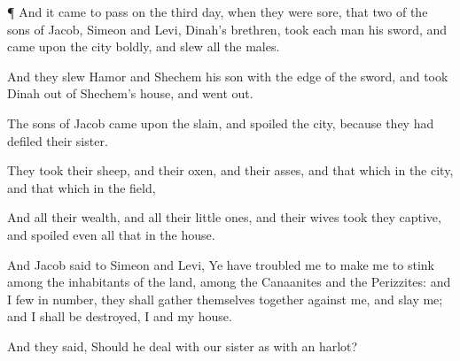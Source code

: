 {\par }{\PP {}¶ And it came to pass on the
third
day, when they were
sore, that
two of the
sons of
Jacob,
Simeon and
Levi,
Dinah’s
brethren,
took each
man his
sword, and
came upon the
city
boldly, and
slew all the
males.

And they
slew
Hamor and
Shechem his
son with the
edge of the
sword, and
took
Dinah
out of
Shechem’s
house, and went
out.

The
sons of
Jacob
came upon the
slain, and
spoiled the
city, because they had
defiled their
sister.

They
took their
sheep, and their
oxen, and their
asses, and that which
{} in the
city, and that which
{} in the
field,

And all their
wealth, and all their little
ones, and their
wives took they
captive, and
spoiled even all that
{} in the
house.

And
Jacob
said to
Simeon and
Levi, Ye have
troubled me to make me to
stink among the
inhabitants of the
land, among the
Canaanites and the
Perizzites: and I
{}
few in
number, they shall gather themselves
together against me, and slay
me; and I shall be
destroyed, I and my
house.

And they
said, Should he
deal with our
sister as with an
harlot?




\par }

